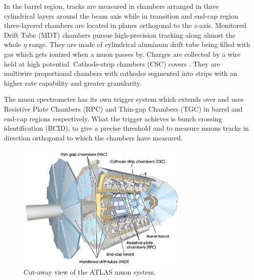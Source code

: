 In the barrel region, tracks are measured in chambers arranged in three cylindrical layers around the beam axis while in transition and end-cap region three-layered chambers are located in planes orthogonal to the $z$-axis. Monitored Drift Tube (MDT) chambers pursue high-precision tracking along almost the whole $\eta$ range. They are made of cylindrical aluminum drift tube being filled with gas which gets ionized when a muon passes by. Charges are collected by a wire held at high potential. Cathode-strip chambers (CSC) covers . They are multiwire proportional chambers with cathodes segmented into strips with an higher rate capability and greater granularity.

The muon spectrometer has its own trigger system which extends over  and uses Resistive Plate Chambers (RPC) and Thin-gap Chambers (TGC) in barrel and end-cap regions respectively. What the trigger achieves is bunch crossing identification (BCID), to give a precise \pt threshold and to measure muons tracks in direction orthogonal to which the chambers have measured.

\begin{figure}[pt]
\centering
\includegraphics[width=0.75\textwidth]{LHC_ATLAS/Muons}
\caption{Cut-away view of the ATLAS muon system.}
\label{fig:muons}
\end{figure}



